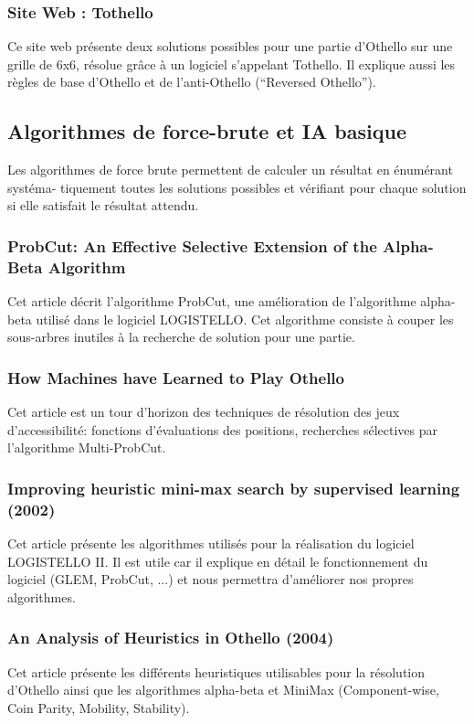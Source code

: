 \documentclass[a4paper,12pt]{article}
\begin{document}
\subsubsection{Site Web : Tothello}
Ce site web \cite{4} présente deux solutions possibles pour une partie d'Othello sur une grille de 6x6, résolue grâce à un logiciel s'appelant Tothello. Il explique aussi les règles de base d'Othello et de l'anti-Othello (“Reversed Othello”).

\subsection{Algorithmes de force-brute et IA basique}

Les algorithmes de force brute permettent de calculer un résultat en
énumérant systéma- tiquement toutes les solutions possibles et vérifiant pour chaque solution si elle satisfait le résultat attendu.

\subsubsection{ProbCut: An Effective Selective Extension of the
  Alpha-Beta Algorithm}
Cet article \cite{5a} décrit l'algorithme ProbCut, une amélioration de
l'algorithme alpha-beta utilisé dans le logiciel LOGISTELLO. Cet
algorithme consiste à couper les sous-arbres inutiles à la recherche
de solution pour une partie.

\subsubsection{How Machines have Learned to Play Othello}
Cet article \cite{5b} est un tour d'horizon des techniques de
résolution des jeux d'accessibilité: fonctions d'évaluations des
positions, recherches sélectives par l'algorithme Multi-ProbCut.

\subsubsection{Improving heuristic mini-max search by supervised learning (2002)}
Cet article \cite{15} présente les algorithmes utilisés pour la
réalisation du logiciel LOGISTELLO II. Il est utile car il explique en
détail le fonctionnement du logiciel (GLEM, ProbCut, ...) et nous
permettra d'améliorer nos propres algorithmes.

\subsubsection{An Analysis of Heuristics in Othello (2004)}
Cet article \cite{13} présente les différents heuristiques utilisables
pour la résolution d'Othello ainsi que les algorithmes alpha-beta et
MiniMax (Component-wise, Coin Parity, Mobility, Stability).
\end{document}
